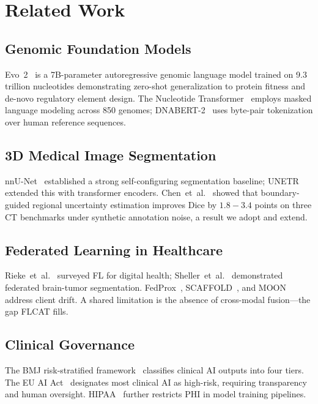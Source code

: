 \documentclass[journal,draftclsnofoot,10pt,onecolumn]{IEEEtran}
\begin{document}
\section{Related Work}
\label{sec:related}

\subsection{Genomic Foundation Models}
Evo~2~\cite{evo2_2026} is a 7B-parameter autoregressive genomic language model
trained on 9.3 trillion nucleotides demonstrating zero-shot generalization to
protein fitness and de-novo regulatory element design. The Nucleotide
Transformer~\cite{nucleotide_transformer_2023} employs masked language modeling
across 850 genomes; DNABERT-2~\cite{zhou2024dnabert2} uses byte-pair
tokenization over human reference sequences.

\subsection{3D Medical Image Segmentation}
nnU-Net~\cite{isensee2021nnunet} established a strong self-configuring
segmentation baseline; UNETR~\cite{hatamizadeh2022unetr} extended this with
transformer encoders. Chen~et~al.~\cite{rue_ct_2025} showed that boundary-guided
regional uncertainty estimation improves Dice by $1.8\!-\!3.4$ points on three
CT benchmarks under synthetic annotation noise, a result we adopt and extend.

\subsection{Federated Learning in Healthcare}
Rieke~et~al.~\cite{rieke2020fedhealth} surveyed FL for digital health;
Sheller~et~al.~\cite{sheller2020braintumor} demonstrated federated brain-tumor
segmentation. FedProx~\cite{li2020fedprox}, SCAFFOLD~\cite{karimireddy2020scaffold},
and MOON~\cite{li2021moon} address client drift. A shared limitation is the
absence of cross-modal fusion---the gap FLCAT fills.

\subsection{Clinical Governance}
The BMJ risk-stratified framework~\cite{bmj_governance_2026} classifies clinical
AI outputs into four tiers. The EU AI Act~\cite{eu_ai_act_2024} designates most
clinical AI as high-risk, requiring transparency and human oversight.
HIPAA~\cite{hipaa_guidance_2024} further restricts PHI in model training pipelines.
\end{document}
